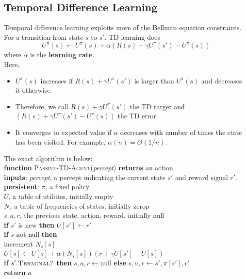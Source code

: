 \documentclass[12pt]{article}
\newcommand{\ind}{\hspace*{15pt}}
\theoremstyle{definition}
\begin{document}
\subsection{Temporal Difference Learning}
Temporal difference learning exploits more of the Bellman equation constraints. \\
For a transition from state $s$ to $s'$. TD learning does
\[
U^{\pi}(s)\leftarrow U^{\pi}(s)+\alpha(R(s)+\gamma U^{\pi}(s')-U^{\pi}(s))
\]
where $\alpha$ is the \textbf{learning rate}.\\
Here, 
\begin{itemize}
	\item $U^{\pi}(s)$ increases if $R(s)+\gamma U^{\pi}(s')$ is larger than $U^{\pi}(s)$ and decreases it otherwise.
	\item Therefore, we call $R(s)+\gamma U^{\pi}(s')$ the TD target and $(R(s)+\gamma U^{\pi}(s')-U^{\pi}(s))$ the TD error.
	\item It converges to expected value if $\alpha$ decreases with number of times the state has been visited. For example, $\alpha(n)=O(1/n)$.
\end{itemize}
The exact algorithm is below:\\
\textbf{function} \textsc{Passive-TD-Agent}(\textit{percept}) \textbf{returns} an action\\
\ind \textbf{inputs}: \textit{percept}, a percept indicating the current state $s'$ and reward signal $r'$.\\
\ind \textbf{persistent}: $\pi$, a fixed policy\\
\ind \ind \ind \ind $U$, a table of utilities, initially empty\\
\ind \ind \ind \ind  $N_s$ a table of frequencies of states, initially zerop\\
\ind \ind \ind \ind  $s,a,r$, the previous state, action, reward, initially null\\

\ind \textbf{if} $s'$ is new \textbf{then} $U[s']\leftarrow r'$\\
\ind \textbf{if} $s$ not null \textbf{then}\\
\ind \ind increment $N_s[s]$\\
\ind \ind $U[s]\leftarrow U[s]+\alpha(N_s[s])(r+\gamma U[s']-U[s])$\\
\ind \textbf{if} $s'.\textsc{Terminal?}$ \textbf{then} $s,a,r\leftarrow$null \textbf{else} $s,a,r\leftarrow s',\pi[s'], r'$\\
\ind \textbf{return} $a$
\end{document}
